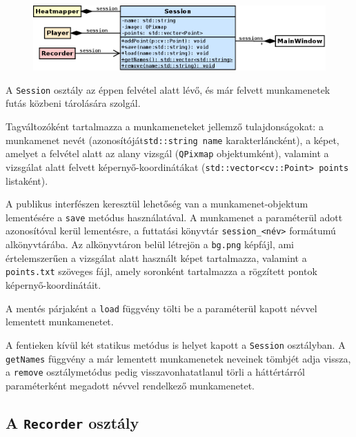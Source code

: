 \begin{figure}[!ht]
\centering
\includegraphics[width=140mm, keepaspectratio]{figures/class_session.png}
\end{figure}

A \texttt{Session} osztály az éppen felvétel alatt lévő, és már felvett munkamenetek futás közbeni tárolására szolgál.

Tagváltozóként tartalmazza a munkameneteket jellemző tulajdonságokat: a munkamenet nevét (azonosítóját\texttt{std::string name} karakterláncként), a képet, amelyet a felvétel alatt az alany vizsgál (\texttt{QPixmap} objektumként), valamint a vizsgálat alatt felvett képernyő-koordinátákat (\texttt{std::vector<cv::Point> points} listaként).

\bigskip

A publikus interfészen keresztül lehetőség van a munkamenet-objektum lementésére a \texttt{save} metódus használatával. A munkamenet a paraméterül adott azonosítóval kerül lementésre, a futtatási könyvtár \texttt{session\_<név>} formátumú alkönyvtárába. Az alkönyvtáron belül létrejön a \texttt{bg.png} képfájl, ami értelemszerűen a vizsgálat alatt használt képet tartalmazza, valamint a \texttt{points.txt} szöveges fájl, amely  soronként tartalmazza a rögzített pontok képernyő-koordinátáit.

A mentés párjaként a \texttt{load} függvény tölti be a paraméterül kapott névvel lementett munkamenetet.

\bigskip

A fentieken kívül két statikus metódus is helyet kapott a \texttt{Session} osztályban. A \texttt{getNames} függvény a már lementett munkamenetek neveinek tömbjét adja vissza, a \texttt{remove} osztálymetódus pedig visszavonhatatlanul törli a háttértárról paraméterként megadott névvel rendelkező munkamenetet.

\subsection{A \texttt{Recorder} osztály}\label{sect:recorder}

